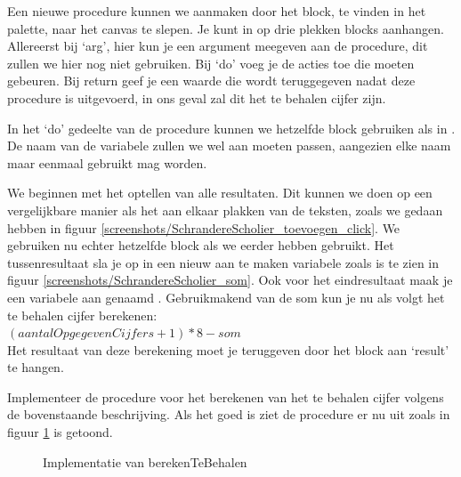Een nieuwe procedure kunnen we aanmaken door het  block, te vinden in het  palette, naar het canvas te slepen. Je kunt in op drie plekken blocks aanhangen. Allereerst bij `arg', hier kun je een argument meegeven aan de procedure, dit zullen we hier nog niet gebruiken. Bij `do' voeg je de acties toe die moeten gebeuren. Bij return geef je een waarde die wordt teruggegeven nadat deze procedure is uitgevoerd, in ons geval zal dit het te behalen cijfer zijn.

In het `do' gedeelte van de procedure kunnen we hetzelfde  block gebruiken als in . De naam van de variabele zullen we wel aan moeten passen, aangezien elke naam maar eenmaal gebruikt mag worden. 

We beginnen met het optellen van alle resultaten. Dit kunnen we doen op een vergelijkbare manier als het aan elkaar plakken van de teksten, zoals we gedaan hebben in figuur \ref{screenshots/SchrandereScholier_toevoegen_click}. We gebruiken nu echter hetzelfde \block{+} block als we eerder hebben gebruikt. Het tussenresultaat sla je op in een nieuw aan te maken variabele zoals is te zien in figuur \ref{screenshots/SchrandereScholier_som}. Ook voor het eindresultaat maak je een variabele aan genaamd . Gebruikmakend van de som kun je nu als volgt het te behalen cijfer berekenen: \\$(aantalOpgegevenCijfers+1) * 8 - som$ \\Het resultaat van deze berekening moet je teruggeven door het block  aan `result' te hangen.

 \begin{opgave}
    \opgVraag
Implementeer de procedure voor het berekenen van het te behalen cijfer volgens de bovenstaande beschrijving.
    \opgUitwerking
    Als het goed is ziet de procedure er nu uit zoals in figuur \ref{screenshots/SchrandereScholier_berekenTeBehalen} is getoond.
\end{opgave}

\begin{figure}
    \caption{\label{screenshots/SchrandereScholier_berekenTeBehalen} Implementatie van berekenTeBehalen}
\end{figure}

